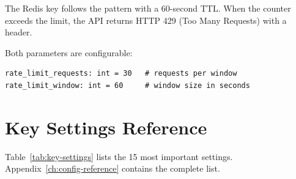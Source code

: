 The Redis key follows the pattern  with a 60-second TTL.
When the counter exceeds the limit, the API returns HTTP 429 (Too Many Requests)
with a  header.

Both parameters are configurable:

\begin{lstlisting}[style=python, numbers=none]
rate_limit_requests: int = 30   # requests per window
rate_limit_window: int = 60     # window size in seconds
\end{lstlisting}


\section{Key Settings Reference}
\label{sec:key-settings-reference}

Table~\ref{tab:key-settings} lists the 15 most important settings.
Appendix~\ref{ch:config-reference} contains the complete list.

